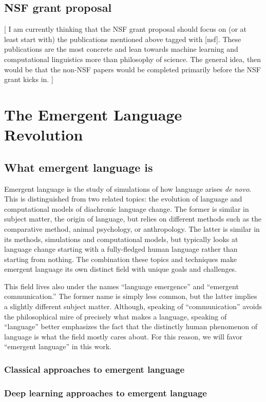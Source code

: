 \documentclass[letterpaper]{report}
\newcommand\bjb[1]{{\color{blue}[#1]}}
\newcommand\cmg[1]{{\color{gray}[#1]}}
\begin{document}
\section{NSF grant proposal}
\bjb{%
I am currently thinking that the NSF grant proposal should focus on (or at least start with) the publications mentioned above tagged with \cmg{nsf}.
These publications are the most concrete and lean towards machine learning and computational linguistics more than philosophy of science.
The general idea, then would be that the non-NSF papers would be completed primarily before the NSF grant kicks in.%
}

\chapter{The Emergent Language Revolution}
\section{What emergent language is}
Emergent language is the study of simulations of how language arises \emph{de novo}.
This is distinguished from two related topics: the evolution of language and computational models of diachronic language change.
The former is similar in subject matter, the origin of language, but relies on different methods such as the comparative method, animal psychology, or anthropology.
The latter is similar in its methods, simulations and computational models, but typically looks at language change starting with a fully-fledged human language rather than starting from nothing.
The combination these topics and techniques make emergent language its own distinct field with unique goals and challenges.

This field lives also under the names ``language emergence'' and ``emergent communication.''
The former name is simply less common, but the latter implies a slightly different subject matter.
Although, speaking of ``communication'' avoids the philosophical mire of precisely what makes a language, speaking of ``language'' better emphasizes the fact that the distinctly human phenomenon of language is what the field mostly cares about.
For this reason, we will favor ``emergent language'' in this work.

\subsection{Classical approaches to emergent language}
\subsection{Deep learning approaches to emergent language}
\end{document}
